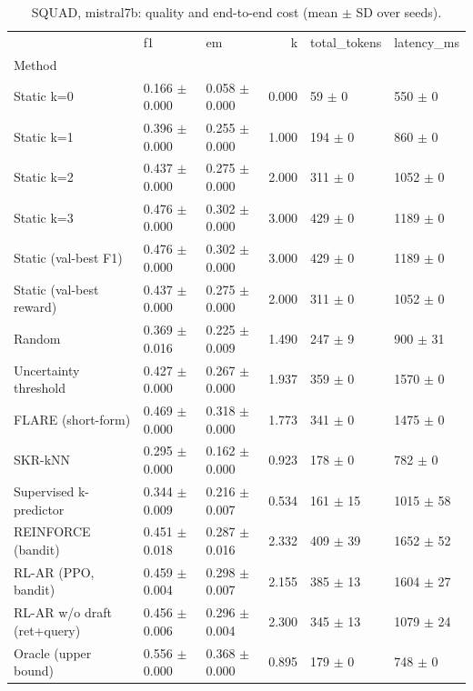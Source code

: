 \begin{table}
\caption{SQUAD, mistral7b: quality and end-to-end cost (mean $\pm$ SD over seeds).}
\begin{tabular}{lllrll}
\toprule
 & f1 & em & k & total_tokens & latency_ms \\
Method &  &  &  &  &  \\
\midrule
Static k=0 & 0.166 $\pm$ 0.000 & 0.058 $\pm$ 0.000 & 0.000 & 59 $\pm$ 0 & 550 $\pm$ 0 \\
Static k=1 & 0.396 $\pm$ 0.000 & 0.255 $\pm$ 0.000 & 1.000 & 194 $\pm$ 0 & 860 $\pm$ 0 \\
Static k=2 & 0.437 $\pm$ 0.000 & 0.275 $\pm$ 0.000 & 2.000 & 311 $\pm$ 0 & 1052 $\pm$ 0 \\
Static k=3 & 0.476 $\pm$ 0.000 & 0.302 $\pm$ 0.000 & 3.000 & 429 $\pm$ 0 & 1189 $\pm$ 0 \\
Static (val-best F1) & 0.476 $\pm$ 0.000 & 0.302 $\pm$ 0.000 & 3.000 & 429 $\pm$ 0 & 1189 $\pm$ 0 \\
Static (val-best reward) & 0.437 $\pm$ 0.000 & 0.275 $\pm$ 0.000 & 2.000 & 311 $\pm$ 0 & 1052 $\pm$ 0 \\
Random & 0.369 $\pm$ 0.016 & 0.225 $\pm$ 0.009 & 1.490 & 247 $\pm$ 9 & 900 $\pm$ 31 \\
Uncertainty threshold & 0.427 $\pm$ 0.000 & 0.267 $\pm$ 0.000 & 1.937 & 359 $\pm$ 0 & 1570 $\pm$ 0 \\
FLARE (short-form) & 0.469 $\pm$ 0.000 & 0.318 $\pm$ 0.000 & 1.773 & 341 $\pm$ 0 & 1475 $\pm$ 0 \\
SKR-kNN & 0.295 $\pm$ 0.000 & 0.162 $\pm$ 0.000 & 0.923 & 178 $\pm$ 0 & 782 $\pm$ 0 \\
Supervised k-predictor & 0.344 $\pm$ 0.009 & 0.216 $\pm$ 0.007 & 0.534 & 161 $\pm$ 15 & 1015 $\pm$ 58 \\
REINFORCE (bandit) & 0.451 $\pm$ 0.018 & 0.287 $\pm$ 0.016 & 2.332 & 409 $\pm$ 39 & 1652 $\pm$ 52 \\
RL-AR (PPO, bandit) & 0.459 $\pm$ 0.004 & 0.298 $\pm$ 0.007 & 2.155 & 385 $\pm$ 13 & 1604 $\pm$ 27 \\
RL-AR w/o draft (ret+query) & 0.456 $\pm$ 0.006 & 0.296 $\pm$ 0.004 & 2.300 & 345 $\pm$ 13 & 1079 $\pm$ 24 \\
Oracle (upper bound) & 0.556 $\pm$ 0.000 & 0.368 $\pm$ 0.000 & 0.895 & 179 $\pm$ 0 & 748 $\pm$ 0 \\
\bottomrule
\end{tabular}
\end{table}
